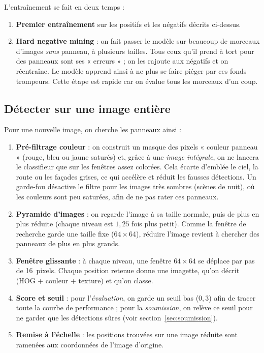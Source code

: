\documentclass[a4paper,10pt]{article}
\begin{document}
L'entraînement se fait en deux temps :
\begin{enumerate}[noitemsep,topsep=2pt]
\item \textbf{Premier entraînement} sur les positifs et les négatifs décrits ci-dessus.
\item \textbf{Hard negative mining} : on fait passer le modèle sur beaucoup de
morceaux d'images \emph{sans} panneau, à plusieurs tailles. Tous ceux qu'il prend à
tort pour des panneaux sont ses « erreurs » ; on les rajoute aux négatifs et on
réentraîne. Le modèle apprend ainsi à ne plus se faire piéger par ces fonds
trompeurs. Cette étape est rapide car on évalue tous les morceaux d'un coup.
\end{enumerate}

\subsection{Détecter sur une image entière}
Pour une nouvelle image, on cherche les panneaux ainsi :
\begin{enumerate}[noitemsep,topsep=2pt]
\item \textbf{Pré-filtrage couleur} : on construit un masque des pixels « couleur
panneau » (rouge, bleu ou jaune saturés) et, grâce à une \emph{image intégrale}, on
ne lancera le classifieur que sur les fenêtres assez colorées. Cela écarte d'emblée le
ciel, la route ou les façades grises, ce qui accélère et réduit les fausses
détections. Un garde-fou désactive le filtre pour les images très sombres (scènes de
nuit), où les couleurs sont peu saturées, afin de ne pas rater ces panneaux.
\item \textbf{Pyramide d'images} : on regarde l'image à sa taille normale, puis de
plus en plus réduite (chaque niveau est $1{,}25$ fois plus petit). Comme la fenêtre de
recherche garde une taille fixe ($64\times64$), réduire l'image revient à chercher des
panneaux de plus en plus grands.
\item \textbf{Fenêtre glissante} : à chaque niveau, une fenêtre $64\times64$ se
déplace par pas de 16~pixels. Chaque position retenue donne une imagette, qu'on décrit
(HOG + couleur + texture) et qu'on classe.
\item \textbf{Score et seuil} : pour l'\emph{évaluation}, on garde un seuil bas
($0{,}3$) afin de tracer toute la courbe de performance ; pour la \emph{soumission},
on relève ce seuil pour ne garder que les détections sûres (voir
section~\ref{sec:soumission}).
\item \textbf{Remise à l'échelle} : les positions trouvées sur une image réduite sont
ramenées aux coordonnées de l'image d'origine.
\end{enumerate}
\end{document}
